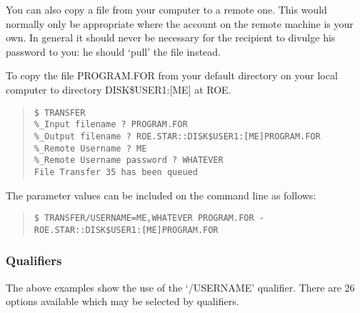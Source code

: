 \begin{example}\rm
You can also copy a file from your computer to a remote one.
This would normally only be appropriate where the account on the remote machine
is your own.
In general it should never be necessary for the recipient to divulge his
password to you: he should `pull' the file instead.

To copy the file PROGRAM.FOR from your default directory on your local computer to
directory DISK\$USER1:[ME] at ROE.
\begin{quote}
{\tt \$ TRANSFER\\
\%\_Input filename ? PROGRAM.FOR\\
\%\_Output filename ? ROE.STAR::DISK\$USER1:[ME]PROGRAM.FOR\\
\%\_Remote Username ? ME\\
\%\_Remote Username password ? WHATEVER\\
File Transfer 35 has been queued}
\end{quote}
The parameter values can be included on the command line as follows:
\begin{quote}
{\tt \$ TRANSFER/USERNAME=ME,WHATEVER PROGRAM.FOR -\\
\hspace*{25mm}ROE.STAR::DISK\$USER1:[ME]PROGRAM.FOR}
\end{quote}
\end{example}
\subsubsection{Qualifiers}
The above examples show the use of the `/USERNAME' qualifier.
There are 26 options available which may be selected by qualifiers.


